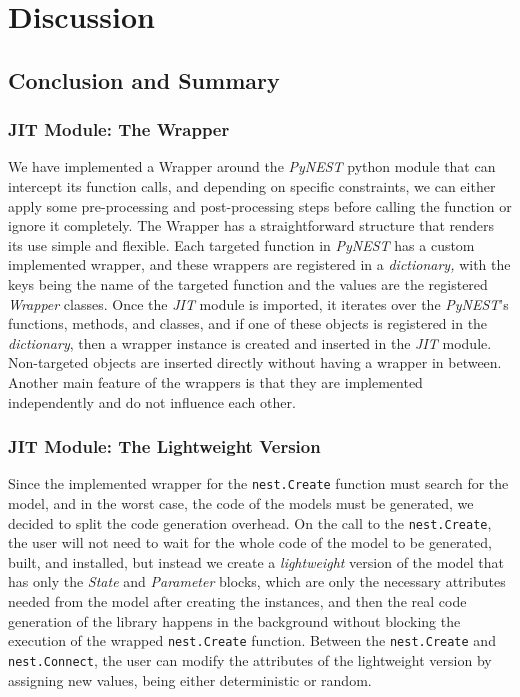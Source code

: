\chapter{Discussion}
 \label{chap:disc}
\section{Conclusion and Summary}

\subsection*{JIT Module: The Wrapper}

We have implemented a Wrapper around the \emph{PyNEST} python module that can intercept its function calls, and depending on specific constraints, we can either apply some pre-processing and post-processing steps before calling the function or ignore it completely. The Wrapper has a straightforward structure that renders its use simple and flexible. Each targeted function in \emph{PyNEST} has a custom implemented wrapper, and these wrappers are registered in a \emph{dictionary,} with the keys being the name of the targeted function and the values are the registered \emph{Wrapper} classes. Once the \emph{JIT} module is imported, it iterates over the \emph{PyNEST}'s functions, methods, and classes, and if one of these objects is registered in the \emph{dictionary}, then a wrapper instance is created and inserted in the \emph{JIT} module. Non-targeted objects are inserted directly without having a wrapper in between. Another main feature of the wrappers is that they are implemented independently and do not influence each other.

\subsection*{JIT Module: The Lightweight Version}

Since the implemented wrapper for the \texttt{nest.Create} function must search for the model, and in the worst case, the code of the models must be generated, we decided to split the code generation overhead. On the call to the \texttt{nest.Create}, the user will not need to wait for the whole code of the model to be generated, built, and installed, but instead we create a \emph{lightweight} version of the model that has only the \emph{State} and \emph{Parameter} blocks, which are only the necessary attributes needed from the model after creating the instances, and then the real code generation of the library happens in the background without blocking the execution of the wrapped \texttt{nest.Create} function. Between the \texttt{nest.Create} and \texttt{nest.Connect}, the user can modify the attributes of the lightweight version by assigning new values, being either deterministic or random.



